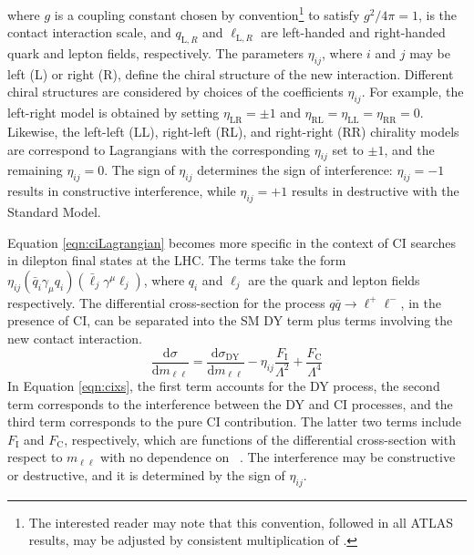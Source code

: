 \noindent where $g$ is a coupling constant chosen by convention\footnote{The interested reader may note that this convention, followed in all ATLAS results, may be adjusted by consistent multiplication of \lam.} to satisfy $g^2/4\pi = 1$, \lam is the contact interaction scale, and $q_{\mathrm L,R}$ and $\ell_{\mathrm L,R}$ are left-handed and right-handed quark and lepton fields, respectively.
The parameters $\eta_{ij}$, where $i$ and $j$ may be left (L) or right (R), define the chiral structure of the new interaction.
Different chiral structures are considered by choices of the coefficients $\eta_{ij}$. For example, the left-right model is obtained by setting $\eta_{\mathrm{LR}} = \pm 1$ and $\eta_{\mathrm{RL}} = \eta_{\mathrm{LL}} = \eta_{\mathrm{RR}} = 0$.
Likewise, the left-left (LL), right-left (RL), and right-right (RR) chirality models are correspond to Lagrangians with the corresponding $\eta_{ij}$ set to $\pm 1$, and the remaining $\eta_{ij}=0$.
The sign of $\eta_{ij}$ determines the sign of interference: $\eta_{ij}=-1$ results in constructive interference, while  $\eta_{ij} = +1$ results in destructive with the Standard Model. 

Equation \ref{eqn:ciLagrangian} becomes more specific in the context of \llqq CI searches in dilepton final states at the LHC.
The terms take the form $\eta_{ij}\left(\bar{q}_i\gamma_{\mu}q_i\right)\left(\bar{\ell}_j\gamma^{\mu}\ell_j\right)$, where $q_i$ and $\ell_j$ are the quark and lepton fields respectively.
The differential cross-section for the process $q\bar{q}\rightarrow\ell^+\ell^-$, in the presence of CI, can be separated into the SM DY term plus terms involving the new contact interaction.
\begin{equation}
\frac{\text{d}\sigma}{\text{d}m_{\ell\ell}} = \frac{\text{d}\sigma_\textrm{DY}}{\text{d}m_{\ell\ell}} - \eta_{ij}\frac{F_\textrm{I}}{\Lambda^2} + \frac{F_\textrm{C}}{\Lambda^4}
\label{eqn:cixs}
\end{equation}
In Equation \ref{eqn:cixs}, the first term accounts for the DY process, the second term corresponds to the interference between the DY and CI processes, and the third term corresponds to the pure CI contribution.
The latter two terms include $F_\textrm{I}$ and $F_\textrm{C}$, respectively, which are functions of the differential cross-section with respect to $m_{\ell\ell}$ with no dependence on \lam~\cite{Eichten:1984eu}.
The interference may be constructive or destructive, and it is determined by the sign of $\eta_{ij}$.

